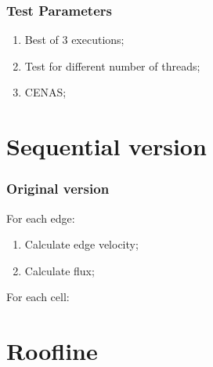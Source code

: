 \documentclass{beamer}
\begin{document}
\begin{frame}[plain]
	\frametitle{Test Parameters}
	\begin{enumerate}
		\item Best of 3 executions;
		\item Test for different number of threads;
		\item CENAS;
	\end{enumerate}
\end{frame}


\section{Sequential version}
\begin{frame}
	\frametitle{Original version}
	For each edge:
	\begin{enumerate}
		\item Calculate edge velocity;
		\item Calculate flux;
	\end{enumerate}
	For each cell:
\end{frame}


\section{Roofline}
\begin{frame}
	\begin{figure}[!htp]
		\label{fig:roofline}
	\end{figure}
\end{frame}
\end{document}
